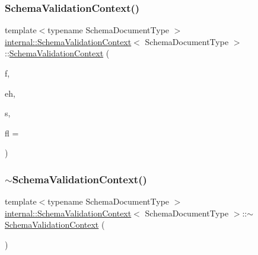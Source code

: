 \subsubsection{\texorpdfstring{Schema\+Validation\+Context()}{SchemaValidationContext()}}
{\footnotesize\ttfamily template$<$typename Schema\+Document\+Type $>$ \\
\hyperlink{structinternal_1_1SchemaValidationContext}{internal\+::\+Schema\+Validation\+Context}$<$ Schema\+Document\+Type $>$\+::\hyperlink{structinternal_1_1SchemaValidationContext}{Schema\+Validation\+Context} (\begin{DoxyParamCaption}\item[{\hyperlink{structinternal_1_1SchemaValidationContext_a33fa91fd8e880d1adb9b891fe441f110}{Schema\+Validator\+Factory\+Type} \&}]{f,  }\item[{\hyperlink{structinternal_1_1SchemaValidationContext_a4d015d68e8957c254b84af5f3550b2f3}{Error\+Handler\+Type} \&}]{eh,  }\item[{const \hyperlink{structinternal_1_1SchemaValidationContext_a79b155ab3711b97b6e33ced450614397}{Schema\+Type} $\ast$}]{s,  }\item[{unsigned}]{fl = {} }\end{DoxyParamCaption})\hspace{0.3cm}{\ttfamily [inline]}}

\mbox{\label{structinternal_1_1SchemaValidationContext_abd287930e1134fe74e3e92580e51e97b}} 
\subsubsection{\texorpdfstring{$\sim$\+Schema\+Validation\+Context()}{~SchemaValidationContext()}}
{\footnotesize\ttfamily template$<$typename Schema\+Document\+Type $>$ \\
\hyperlink{structinternal_1_1SchemaValidationContext}{internal\+::\+Schema\+Validation\+Context}$<$ Schema\+Document\+Type $>$\+::$\sim$\hyperlink{structinternal_1_1SchemaValidationContext}{Schema\+Validation\+Context} (\begin{DoxyParamCaption}{ }\end{DoxyParamCaption})\hspace{0.3cm}{\ttfamily [inline]}}



